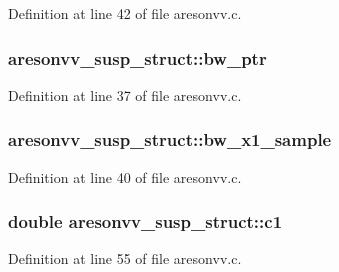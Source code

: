 Definition at line 42 of file aresonvv.\+c.

\subsubsection[{\texorpdfstring{bw\+\_\+ptr}{bw_ptr}}]{ aresonvv\+\_\+susp\+\_\+struct\+::bw\+\_\+ptr}\hypertarget{structaresonvv__susp__struct_a78140da1b7a52e34a5c64a9fbc08ec10}{}\label{structaresonvv__susp__struct_a78140da1b7a52e34a5c64a9fbc08ec10}


Definition at line 37 of file aresonvv.\+c.

\subsubsection[{\texorpdfstring{bw\+\_\+x1\+\_\+sample}{bw_x1_sample}}]{ aresonvv\+\_\+susp\+\_\+struct\+::bw\+\_\+x1\+\_\+sample}\hypertarget{structaresonvv__susp__struct_a219946626ef5deb6dda6299432a15638}{}\label{structaresonvv__susp__struct_a219946626ef5deb6dda6299432a15638}


Definition at line 40 of file aresonvv.\+c.

\subsubsection[{\texorpdfstring{c1}{c1}}]{\setlength{\rightskip}{0pt plus 5cm}double aresonvv\+\_\+susp\+\_\+struct\+::c1}\hypertarget{structaresonvv__susp__struct_a2799e02810f92daafafcfcd3b7d2fa9e}{}\label{structaresonvv__susp__struct_a2799e02810f92daafafcfcd3b7d2fa9e}


Definition at line 55 of file aresonvv.\+c.

